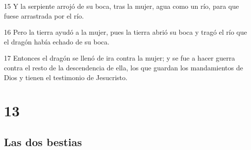 \par 15 Y la serpiente arrojó de su boca, tras la mujer, agua como un río, para que fuese arrastrada por el río.
\par 16 Pero la tierra ayudó a la mujer, pues la tierra abrió su boca y tragó el río que el dragón había echado de su boca.
\par 17 Entonces el dragón se llenó de ira contra la mujer; y se fue a hacer guerra contra el resto de la descendencia de ella, los que guardan los mandamientos de Dios y tienen el testimonio de Jesucristo.

\chapter{13}

\section*{Las dos bestias}

